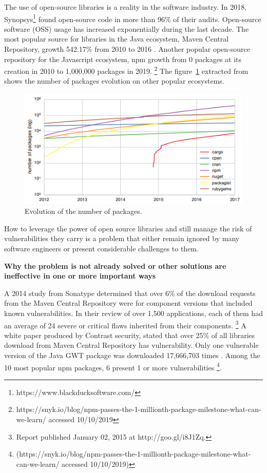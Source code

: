 \documentclass[pdf,bookmarks,colorlinks=true]{IEEEtran}
\begin{document}
The use of open-source libraries is a reality in the software industry. In 2018, Synopsys\footnote{https://www.blackducksoftware.com/} found open-source code in more than 96\% of their audits\cite{Synopsys2019}. Open-source software (OSS) usage has increased exponentially during the last decade. The most popular source for libraries in the Java ecosystem, Maven Central Repository, growth 542.17\% from 2010 to 2016 \cite{Kula2018}. Another popular open-source repository for the Javascript ecosystem, npm growth from 0 packages at its creation in 2010 to 1,000,000 packages in 2019. \footnote{https://snyk.io/blog/npm-passes-the-1-millionth-package-milestone-what-can-we-learn/ accessed 10/10/2019}  
The figure~\ref{PackageEvolution} extracted from \cite{Decan} shows the number of packages evolution on other popular ecosystems.
\begin{figure}[h]
	\centering
	\includegraphics[scale=0.70]{PackagesEvolution.png}
	\caption{Evolution of the number of packages.}
	\label{PackageEvolution}
\end{figure}
How to leverage the power of open source libraries and still manage the risk of vulnerabilities they carry is a problem that either remain ignored by many software engineers or present considerable challenges to them.



\textbf{Why the problem is not already solved or other solutions
are ineffective in one or more important ways}

A 2014 study from Sonatype determined that over 6\% of the download requests from the Maven Central Repository were for component versions that included known vulnerabilities. In their review of over 1,500 applications, each of them had an average of 24 severe or critical flaws inherited from their components. \footnote{Report published January 02, 2015 at http://goo.gl/i8J1Zq.}
A white paper produced by Contrast security, stated that over 25\% of all libraries download from Maven Central Repository has vulnerability. Only one vulnerable version of the Java GWT package was downloaded 17,666,703 times \cite{williams2012unfortunate}.
Among the 10 most popular npm packages, 6 present 1 or more vulnerabilities \footnote{(https://snyk.io/blog/npm-passes-the-1-millionth-package-milestone-what-can-we-learn/ accessed 10/10/2019)}.
\end{document}
